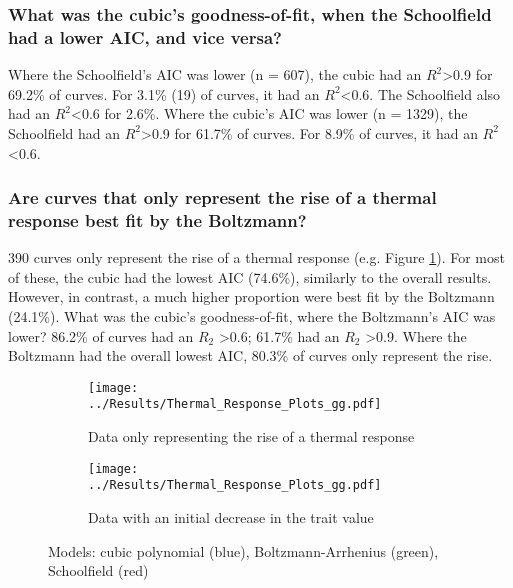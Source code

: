 \documentclass[11pt]{article}
\begin{document}
\subsubsection*{What was the cubic's goodness-of-fit, when the Schoolfield had a lower AIC, and vice versa?}
Where the Schoolfield's AIC was lower (n = 607), the cubic had an $R^{2}$\textgreater 0.9 for 69.2\% of curves. For 3.1\% (19) of curves, it had an $R^{2}$\textless 0.6. The Schoolfield also had an $R^{2}$\textless 0.6 for 2.6\%.
Where the cubic's AIC was lower (n = 1329), the Schoolfield had an $R^{2}$\textgreater 0.9 for 61.7\% of curves. For 8.9\% of curves, it had an $R^{2}$\textless 0.6.


\subsubsection*{Are curves that only represent the rise of a thermal response best fit by the Boltzmann?}
390 curves only represent the rise of a thermal response (e.g. Figure \ref{Curve_rise_only}). For most of these, the cubic had the lowest AIC (74.6\%), similarly to the overall results. However, in contrast, a much higher proportion were best fit by the Boltzmann (24.1\%). What was the cubic's goodness-of-fit, where the Boltzmann's AIC was lower? 86.2\% of curves had an $R_{2}$ \textgreater 0.6; 61.7\% had an $R_{2}$ \textgreater 0.9.
Where the Boltzmann had the overall lowest AIC, 80.3\% of curves only represent the rise.

\begin{figure}[h]
	\centering
	\begin{subfigure}{.5\textwidth}
		\centering
		\texttt{[image: ../Results/Thermal\_Response\_Plots\_gg.pdf]}
		\caption{Data only representing the rise of a thermal response}
		\label{Curve_rise_only}
	\end{subfigure}%
	\begin{subfigure}{.5\textwidth}
		\centering
		\texttt{[image: ../Results/Thermal\_Response\_Plots\_gg.pdf]}
		\caption{Data with an initial decrease in the trait value}
		\label{Curve_initial_decrease}
	\end{subfigure}
	\caption{Models: cubic polynomial (blue), Boltzmann-Arrhenius (green), Schoolfield (red)} %
\end{figure}
\end{document}
